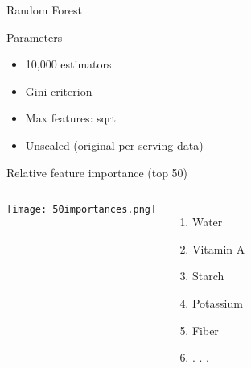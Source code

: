 \documentclass{beamer}
\begin{document}
\begin{frame}{Random Forest}
	\begin{block}{Parameters}
		\begin{itemize}
			\item 10,000 estimators
			\item Gini criterion
			\item Max features: sqrt
			\item Unscaled (original per-serving data)
		\end{itemize}
	\end{block}
	
	\begin{block}{Relative feature importance (top 50)}
		\begin{columns}
			\column[T]{5cm}
			\centering
			\texttt{[image: 50importances.png]}
			
			\column[T]{3cm}
			\begin{enumerate}
				\item Water
				\item Vitamin A
				\item Starch
				\item Potassium
				\item Fiber
				\item . . .
			\end{enumerate}
		\end{columns}
		
	\end{block}	
	
\end{frame}
\end{document}

